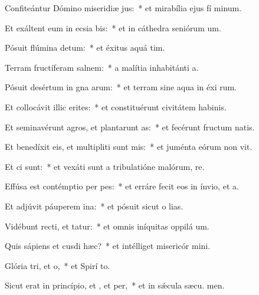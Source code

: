 \item Confiteántur Dómino miseridiæ jus:~* et mirabília ejus fí minum.
\item Et exáltent eum in ecsia bis:~* et in cáthedra seniórum  um.
\item Pósuit flúmina  detum:~* et éxitus aquá  tim.
\item Terram fructíferam  salnem:~* a malítia inhabitánti  a.
\item Pósuit desértum in gna arum:~* et terram sine aqua in éxi rum.
\item Et collocávit illic erites:~* et constituérunt civitátem habinis.
\item Et seminavérunt agros, et plantarunt as:~* et fecérunt fructum natis.
\item Et benedíxit eis, et multipliti sunt mis:~* et juménta eórum non vit.
\item Et ci  sunt:~* et vexáti sunt a tribulatióne malórum,  re.
\item Effúsa est contémptio per pes:~* et erráre fecit eos in ínvio, et   a.
\item Et adjúvit páuperem  ina:~* et pósuit sicut o lias.
\item Vidébunt recti, et tatur:~* et omnis iníquitas oppilá  um.
\item Quis sápiens et cusdi hæc?~* et intélliget misericór mini.
\item Glória tri, et o,~* et Spirí to.
\item Sicut erat in princípio, et , et per,~* et in sǽcula sæcu. men.
